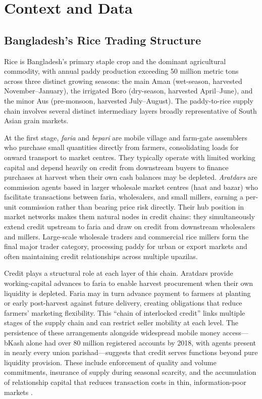 \documentclass[authoryear,preprint,review,12pt]{elsarticle}
\begin{document}
\section{Context and Data}
\label{sec:data}

\subsection{Bangladesh's Rice Trading Structure}

Rice is Bangladesh's primary staple crop and the dominant agricultural
commodity, with annual paddy production exceeding 50 million metric tons
across three distinct growing seasons: the main Aman (wet-season, harvested
November--January), the irrigated Boro (dry-season, harvested April--June),
and the minor Aus (pre-monsoon, harvested July--August). The paddy-to-rice
supply chain involves several distinct intermediary layers broadly
representative of South Asian grain markets.

At the first stage, \textit{faria} and \textit{bepari} are mobile village
and farm-gate assemblers who purchase small quantities directly from farmers,
consolidating loads for onward transport to market centres. They typically
operate with limited working capital and depend heavily on credit from
downstream buyers to finance purchases at harvest when their own cash
balances may be depleted. \textit{Aratdars} are commission agents based
in larger wholesale market centres (haat and bazar) who facilitate transactions
between faria, wholesalers, and small millers, earning a per-unit commission
rather than bearing price risk directly. Their hub position in market
networks makes them natural nodes in credit chains: they simultaneously
extend credit upstream to faria and draw on credit from downstream
wholesalers and millers. Large-scale wholesale traders and commercial
rice millers form the final major trader category, processing paddy for
urban or export markets and often maintaining credit relationships across
multiple upazilas.

Credit plays a structural role at each layer of this chain. Aratdars
provide working-capital advances to faria to enable harvest procurement
when their own liquidity is depleted. Faria may in turn advance payment
to farmers at planting or early post-harvest against future delivery,
creating obligations that reduce farmers' marketing flexibility.
This ``chain of interlocked credit'' \citep{crow_murshid1992} links
multiple stages of the supply chain and can restrict seller mobility at
each level. The persistence of these arrangements alongside widespread
mobile money access---bKash alone had over 80 million registered accounts
by 2018, with agents present in nearly every union parishad---suggests
that credit serves functions beyond pure liquidity provision. These include
enforcement of quality and volume commitments, insurance of supply during
seasonal scarcity, and the accumulation of relationship capital that
reduces transaction costs in thin, information-poor markets
\citep{murshid1992}.
\end{document}
